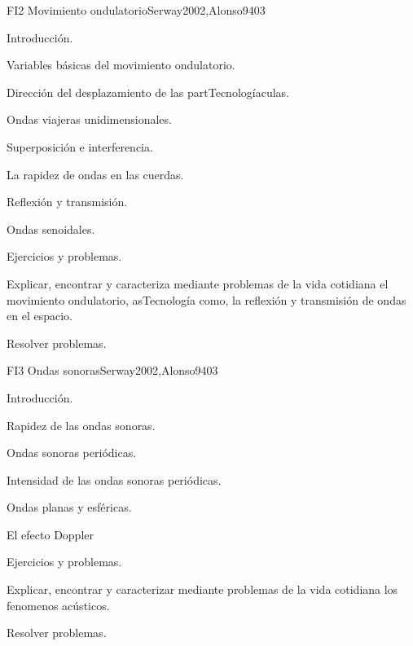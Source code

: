 \begin{syllabus}
\begin{unit}{FI2 Movimiento ondulatorio}{}{Serway2002,Alonso94}{0}{3}
\begin{topics}
      \item Introducción.
        \item Variables básicas del movimiento ondulatorio.
        \item Dirección del desplazamiento de las partTecnologíaculas.
        \item Ondas viajeras unidimensionales.
        \item Superposición e interferencia.
        \item La rapidez de ondas en las cuerdas.
        \item Reflexión y transmisión.
        \item Ondas senoidales.
        \item Ejercicios y problemas.
   \end{topics}
   \begin{learningoutcomes}
      \item Explicar, encontrar y caracteriza mediante problemas de la vida cotidiana el movimiento ondulatorio, asTecnología como, la reflexión y transmisión de ondas en el espacio.
      \item Resolver problemas.
   \end{learningoutcomes}
\end{unit}

\begin{unit}{FI3 Ondas sonoras}{}{Serway2002,Alonso94}{0}{3}
\begin{topics}
      \item  Introducción.
        \item Rapidez de las ondas sonoras.
        \item Ondas sonoras periódicas.
        \item Intensidad de las ondas sonoras periódicas.
        \item Ondas planas y esféricas.
        \item El efecto Doppler
        \item Ejercicios y problemas.
   \end{topics}
   \begin{learningoutcomes}
      \item Explicar, encontrar y caracterizar mediante problemas de la vida cotidiana los fenomenos acústicos.
      \item Resolver problemas.
   \end{learningoutcomes}
\end{unit}


\end{syllabus}
